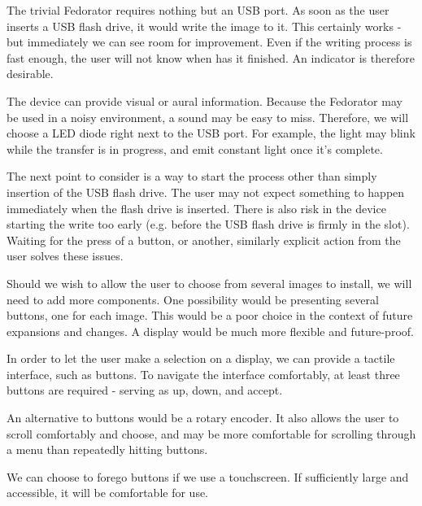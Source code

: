        The trivial Fedorator requires nothing but an USB port.  As soon as the user inserts a USB flash drive, it would write the image to it.  This certainly works - but immediately we can see room for improvement.  Even if the writing process is fast enough, the user will not know when has it finished.  An indicator is therefore desirable.
        
        The device can provide visual or aural information.  Because the Fedorator may be used in a noisy environment, a sound may be easy to miss.  Therefore, we will choose a LED diode right next to the USB port.  For example, the light may blink while the transfer is in progress, and emit constant light once it's complete.
        
        The next point to consider is a way to start the process other than simply insertion of the USB flash drive.  The user may not expect something to happen immediately when the flash drive is inserted.  There is also risk in the device starting the write too early (e.g. before the USB flash drive is firmly in the slot).  Waiting for the press of a button, or another, similarly explicit action from the user solves these issues.
        
        Should we wish to allow the user to choose from several images to install, we will need to add more components.  One possibility would be presenting several buttons, one for each image.  This would be a poor choice in the context of future expansions and changes.  A display would be much more flexible and future-proof.
        
        In order to let the user make a selection on a display, we can provide a tactile interface, such as buttons.  To navigate the interface comfortably, at least three buttons are required - serving as up, down, and accept.
        
        An alternative to buttons would be a rotary encoder.  It also allows the user to scroll comfortably and choose, and may be more comfortable for scrolling through a menu than repeatedly hitting buttons.
        
        We can choose to forego buttons if we use a touchscreen.  If sufficiently large and accessible, it will be comfortable for use.
        
        
